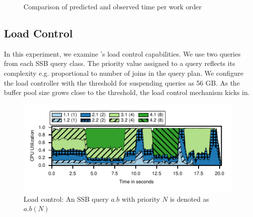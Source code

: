 \begin{figure}[t]
	\centering
	\caption{Comparison of predicted and observed time per work order}
	\label{fig:pred-vs-observed-time-per-wo}
	\vspace{-2em}
\end{figure}

\subsection{Load Control}
In this experiment, we examine \sys{}'s load control capabilities.
We use two queries from each SSB query class.
The priority value assigned to a query reflects its complexity e.g. proportional to number of joins in the query plan.
We configure the load controller with the threshold for suspending queries as 56 GB. 
As the buffer pool size grows close to the threshold, the load control mechanism kicks in.

\begin{figure}[]
	\centering
	\includegraphics[width=\columnwidth]{figures/load-control-cpu-util.pdf}
	\vspace{-2.5em}	
	\caption{Load control: An SSB query $a.b$ with priority $N$ is denoted as $a.b (N)$}
	\label{fig:load-control-cpu-util}
	\vspace{-2em}	
\end{figure}

